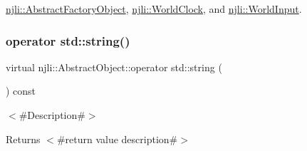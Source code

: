 \mbox{\hyperlink{classnjli_1_1_abstract_factory_object_a207c86146d40d0794708ae7f2d4e60a7}{njli\+::\+Abstract\+Factory\+Object}}, \mbox{\hyperlink{classnjli_1_1_world_clock_ada98188afadfa5dc712d96a0d12f56a2}{njli\+::\+World\+Clock}}, and \mbox{\hyperlink{classnjli_1_1_world_input_ab2554a67aa2c53446395db34315a4d2a}{njli\+::\+World\+Input}}.

\mbox{\label{classnjli_1_1_abstract_object_afc07f4138bd3003910e7aa7fa0fe11ad}} 
\subsubsection{\texorpdfstring{operator std\+::string()}{operator std::string()}}
{\footnotesize\ttfamily virtual njli\+::\+Abstract\+Object\+::operator std\+::string (\begin{DoxyParamCaption}{ }\end{DoxyParamCaption}) const\hspace{0.3cm}{\ttfamily [pure virtual]}}

$<$\#\+Description\#$>$

\begin{DoxyReturn}{Returns}
$<$\#return value description\#$>$ 
\end{DoxyReturn}


